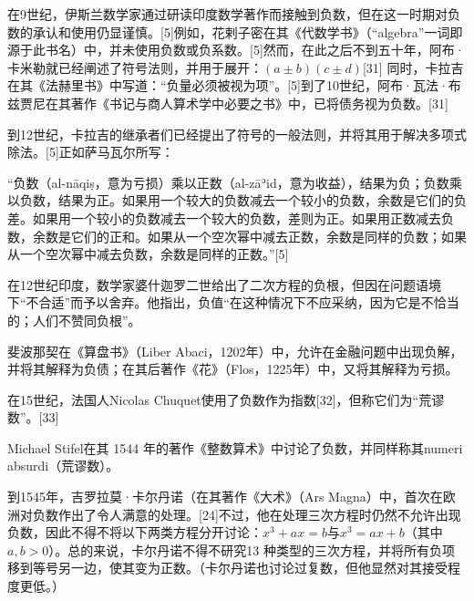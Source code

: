 在9世纪，伊斯兰数学家通过研读印度数学著作而接触到负数，但在这一时期对负数的承认和使用仍显谨慎。[5]例如，花剌子密在其《代数学书》（“algebra”一词即源于此书名）中，并未使用负数或负系数。[5]然而，在此之后不到五十年，阿布·卡米勒就已经阐述了符号法则，并用于展开：$(a \pm b)(c \pm d)$[31] 同时，卡拉吉在其《法赫里书》中写道：“负量必须被视为项”。[5]到了10世纪，阿布·瓦法·布兹贾尼在其著作《书记与商人算术学中必要之书》中，已将债务视为负数。[31]

到12世纪，卡拉吉的继承者们已经提出了符号的一般法则，并将其用于解决多项式除法。[5]正如萨马瓦尔所写：

“负数（al-nāqiṣ，意为亏损）乘以正数（al-zāʾid，意为收益），结果为负；负数乘以负数，结果为正。如果用一个较大的负数减去一个较小的负数，余数是它们的负差。如果用一个较小的负数减去一个较大的负数，差则为正。如果用正数减去负数，余数是它们的正和。如果从一个空次幂中减去正数，余数是同样的负数；如果从一个空次幂中减去负数，余数是同样的正数。”[5]

在12世纪印度，数学家婆什迦罗二世给出了二次方程的负根，但因在问题语境下“不合适”而予以舍弃。他指出，负值“在这种情况下不应采纳，因为它是不恰当的；人们不赞同负根”。

斐波那契在《算盘书》（Liber Abaci，1202年）中，允许在金融问题中出现负解，并将其解释为负债；在其后著作《花》（Flos，1225年）中，又将其解释为亏损。

在15世纪，法国人Nicolas Chuquet使用了负数作为指数[32]，但称它们为“荒谬数”。[33]

Michael Stifel在其 1544 年的著作《整数算术》中讨论了负数，并同样称其numeri absurdi（荒谬数）。

到1545年，吉罗拉莫·卡尔丹诺（在其著作《大术》（Ars Magna）中，首次在欧洲对负数作出了令人满意的处理。[24]不过，他在处理三次方程时仍然不允许出现负数，因此不得不将以下两类方程分开讨论：$x^{3} + ax = b$与$x^{3} = ax + b$（其中 $a, b > 0$）。总的来说，卡尔丹诺不得不研究13 种类型的三次方程，并将所有负项移到等号另一边，使其变为正数。（卡尔丹诺也讨论过复数，但他显然对其接受程度更低。）

